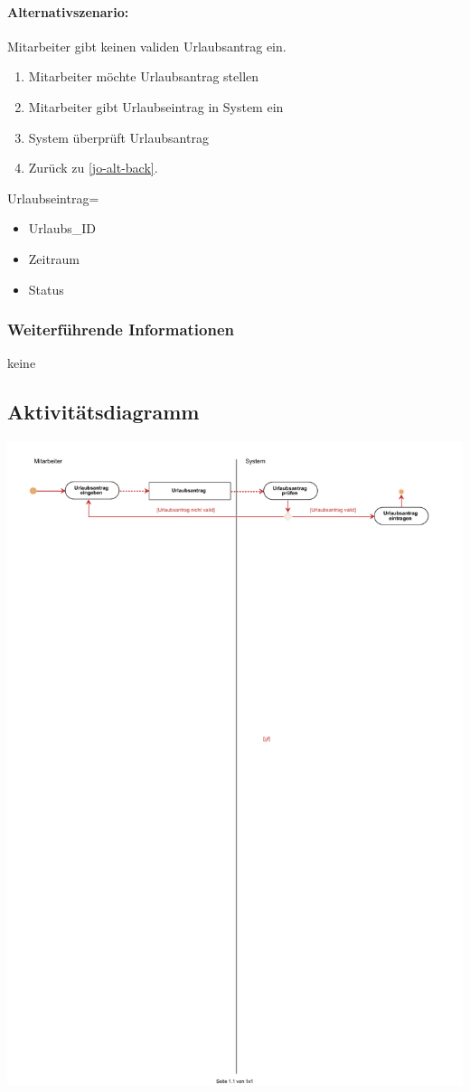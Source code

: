 \paragraph{Alternativszenario:} Mitarbeiter gibt keinen validen Urlaubsantrag ein.
\begin{enumerate}
\item Mitarbeiter möchte Urlaubsantrag stellen
\item Mitarbeiter gibt Urlaubseintrag in System ein \label{jo-alt-back}
\item System überprüft Urlaubsantrag
\item Zurück zu \ref{jo-alt-back}.
\end{enumerate}

Urlaubseintrag=
\begin{itemize}[label=+]
\item[] Urlaubs\_ID
\item Zeitraum
\item Status
\end{itemize}

\subsubsection{Weiterführende Informationen}
keine

\subsection{Aktivitätsdiagramm}

\begin{center}
	\includegraphics[width=0.9\linewidth]{Urlaub_einreichen.pdf}
\end{center}

